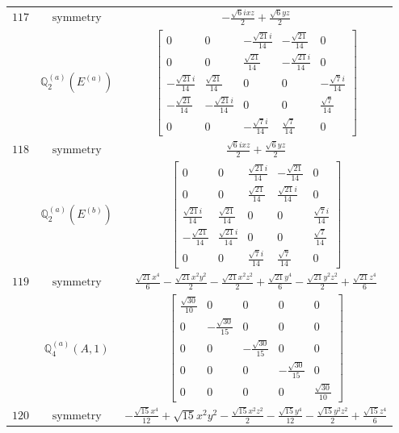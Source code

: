 \documentclass[fleqn,8pt,landscape]{jsarticle}
\begin{document}
\begin{longtable}{ccc}
$ 117 $ & $ \text{symmetry} $ & $ - \frac{\sqrt{6} i x z}{2} + \frac{\sqrt{6} y z}{2} $ \\
$  $ & $ \mathbb{Q}_{2}^{(a)}(E^{(a)}) $ & $ \begin{bmatrix} 0 & 0 & - \frac{\sqrt{21} i}{14} & - \frac{\sqrt{21}}{14} & 0 \\ 0 & 0 & \frac{\sqrt{21}}{14} & - \frac{\sqrt{21} i}{14} & 0 \\ - \frac{\sqrt{21} i}{14} & \frac{\sqrt{21}}{14} & 0 & 0 & - \frac{\sqrt{7} i}{14} \\ - \frac{\sqrt{21}}{14} & - \frac{\sqrt{21} i}{14} & 0 & 0 & \frac{\sqrt{7}}{14} \\ 0 & 0 & - \frac{\sqrt{7} i}{14} & \frac{\sqrt{7}}{14} & 0 \end{bmatrix} $ \\ \hline
$ 118 $ & $ \text{symmetry} $ & $ \frac{\sqrt{6} i x z}{2} + \frac{\sqrt{6} y z}{2} $ \\
$  $ & $ \mathbb{Q}_{2}^{(a)}(E^{(b)}) $ & $ \begin{bmatrix} 0 & 0 & \frac{\sqrt{21} i}{14} & - \frac{\sqrt{21}}{14} & 0 \\ 0 & 0 & \frac{\sqrt{21}}{14} & \frac{\sqrt{21} i}{14} & 0 \\ \frac{\sqrt{21} i}{14} & \frac{\sqrt{21}}{14} & 0 & 0 & \frac{\sqrt{7} i}{14} \\ - \frac{\sqrt{21}}{14} & \frac{\sqrt{21} i}{14} & 0 & 0 & \frac{\sqrt{7}}{14} \\ 0 & 0 & \frac{\sqrt{7} i}{14} & \frac{\sqrt{7}}{14} & 0 \end{bmatrix} $ \\ \hline
$ 119 $ & $ \text{symmetry} $ & $ \frac{\sqrt{21} x^{4}}{6} - \frac{\sqrt{21} x^{2} y^{2}}{2} - \frac{\sqrt{21} x^{2} z^{2}}{2} + \frac{\sqrt{21} y^{4}}{6} - \frac{\sqrt{21} y^{2} z^{2}}{2} + \frac{\sqrt{21} z^{4}}{6} $ \\
$  $ & $ \mathbb{Q}_{4}^{(a)}(A,1) $ & $ \begin{bmatrix} \frac{\sqrt{30}}{10} & 0 & 0 & 0 & 0 \\ 0 & - \frac{\sqrt{30}}{15} & 0 & 0 & 0 \\ 0 & 0 & - \frac{\sqrt{30}}{15} & 0 & 0 \\ 0 & 0 & 0 & - \frac{\sqrt{30}}{15} & 0 \\ 0 & 0 & 0 & 0 & \frac{\sqrt{30}}{10} \end{bmatrix} $ \\ \hline
$ 120 $ & $ \text{symmetry} $ & $ - \frac{\sqrt{15} x^{4}}{12} + \sqrt{15} x^{2} y^{2} - \frac{\sqrt{15} x^{2} z^{2}}{2} - \frac{\sqrt{15} y^{4}}{12} - \frac{\sqrt{15} y^{2} z^{2}}{2} + \frac{\sqrt{15} z^{4}}{6} $ \\

\end{longtable}
\end{document}
